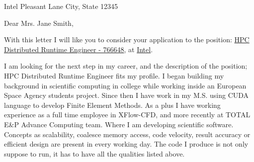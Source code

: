 \documentclass[11pt]{letter} %
\newcommand{\fullName}{Adri\'an Garc\'ia Prado}
\newcommand{\phoneMobileLine}{+1 (832) 863 1029}
\newcommand{\companyName}{Intel}
\newcommand{\companyURL}{http://intel.com}
\newcommand{\companyAddress}{123 Pleasant Lane \newline
City, State 12345}
\newcommand{\companyHHRRperson}{Mrs. Jane Smith}
\newcommand{\companyHHRR}{\companyHHRRperson \newline
Recruitment Officer}
\newcommand{\jobId}{- 766648}
\newcommand{\jobName}{HPC Distributed Runtime Engineer }
\newcommand{\jobURL}{https://www-ssl.intel.com/content/www/us/en/jobs/job-search/js2.html?job=766648&src=ML-12700}
\newcommand{\jobPosition}{\href{\jobURL}{\jobName\jobId}, at \href{\companyURL}{\companyName}}
\begin{document}

\begin{letter}{\companyName \newline
\companyAddress \newline
\newline}



\signature{\fullName} %


\opening{Dear \companyHHRRperson,} 
 
With this letter I will like you to consider your application to the position: \jobPosition.


I am looking for the next step in my career, and the description of the position; \jobName fits my profile. I began building my background in scientific computing in college while working inside an European Space Agency students project. Since then I have work in my M.S. using CUDA language to develop Finite Element Methods. As a plus I have working experience as a full time employee in XFlow-CFD, and more recently at TOTAL E\&P Advance Computing team. Where I am developing scientific software. Concepts as scalability, coalesce memory access, code velocity, result accuracy or efficient design are present in every working day. The code I produce is not only suppose to run,
it has to have all the qualities listed above.


\end{letter}
\end{document}
